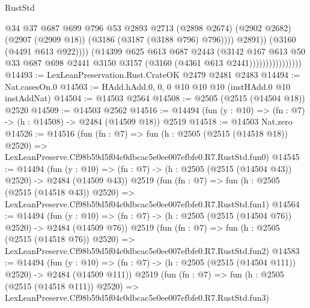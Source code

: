 \begin{lexlean}{RustStd}
\begin{coremodule}
                                        @34
                                        @37
                                        @687
                                        @699
                                        @796
                                        @53
                                        @2893
                                        @2713
                                        (@2898 @2674)
                                        (@2902 @2682)
                                        (@2907 (@2909 @18))
                                        (@3186 (@3187 (@3188 @796) @796))))
                                    @2891))
                                (@3160 (@4491 @613 @922))))
                            (@14399
                              @625
                              @613
                              @687
                              @2443
                              (@3142
                                @167
                                @613
                                @50
                                @33
                                @687
                                @698
                                @2441
                                @3150
                                @3157
                                (@3160 (@4361 @613 @2441))))))))))))))))
@14493 := LexLeanPreservation.Rust.CrateOK @2479 @2481 @2483
@14494 := Nat.casesOn.{0}
@14503 := HAdd.hAdd.{0, 0, 0} @10 @10 @10 (instHAdd.{0} @10 instAddNat)
@14504 := @14503 @2564
@14508 := @2505 (@2515 (@14504 @18)) @2520
@14509 := @14503 @2562
@14516 := @14494 (fun (y : @10) => (fn : @7) -> (h : @14508) -> @2484 (@14509 @18)) @2519
@14518 := @14503 Nat.zero
@14526 := @14516
    (fun (fn : @7) =>
    fun (h : @2505 (@2515 (@14518 @18)) @2520) =>
    LexLeanPreserve.Cf98b59d5f04c0dbcac5e0ee007efbfe0.R7.RustStd.fun0)
@14545 := @14494
    (fun (y : @10) => (fn : @7) -> (h : @2505 (@2515 (@14504 @43)) @2520) -> @2484 (@14509 @43))
    @2519
    (fun (fn : @7) =>
    fun (h : @2505 (@2515 (@14518 @43)) @2520) =>
    LexLeanPreserve.Cf98b59d5f04c0dbcac5e0ee007efbfe0.R7.RustStd.fun1)
@14564 := @14494
    (fun (y : @10) => (fn : @7) -> (h : @2505 (@2515 (@14504 @76)) @2520) -> @2484 (@14509 @76))
    @2519
    (fun (fn : @7) =>
    fun (h : @2505 (@2515 (@14518 @76)) @2520) =>
    LexLeanPreserve.Cf98b59d5f04c0dbcac5e0ee007efbfe0.R7.RustStd.fun2)
@14583 := @14494
    (fun (y : @10) => (fn : @7) -> (h : @2505 (@2515 (@14504 @111)) @2520) -> @2484 (@14509 @111))
    @2519
    (fun (fn : @7) =>
    fun (h : @2505 (@2515 (@14518 @111)) @2520) =>
    LexLeanPreserve.Cf98b59d5f04c0dbcac5e0ee007efbfe0.R7.RustStd.fun3)

\end{coremodule}
\end{lexlean}
